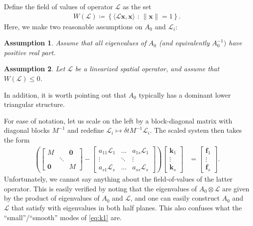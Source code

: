 \documentclass[a4paper,10pt]{article}
\newtheorem{assumption}{Assumption}
\begin{document}
Define the field of values of operator $\mathcal{L}$ as the set
%
\begin{align}\label{eq:fov}
W(\mathcal{L}) \coloneqq \left\{ \langle \mathcal{L}\mathbf{x},\mathbf{x}\rangle \text{ : }
	\|\mathbf{x}\| = 1 \right\}.
\end{align}
Here, we make two reasonable assumptions on $A_0$ and $\mathcal{L}_i$:
%
\begin{assumption}\label{ass:eig}
Assume that all eigenvalues of $A_0$ (and equivalently $A_0^{-1})$ have positive real part.
\end{assumption}
\begin{assumption}\label{ass:fov}
Let $\mathcal{L}$ be a linearized spatial operator, and assume that $W(\mathcal{L}) \leq 0$.
\end{assumption}
%
\noindent
In addition, it is worth pointing out that $A_0$ typically has a dominant
lower triangular structure.

For ease of notation, let us scale on the left by a block-diagonal matrix
with diagonal blocks $M^{-1}$ and redefine $\mathcal{L}_i \mapsto
\delta tM^{-1}\mathcal{L}_i$. The scaled system then takes the form
%
\begin{align}\label{eq:k1}
\left( \begin{bmatrix} M & & \mathbf{0} \\ & \ddots \\ \mathbf{0} & & M \end{bmatrix}
	- \begin{bmatrix} a_{11}\mathcal{L}_1 & ... & a_{1s}\mathcal{L}_1 \\
	\vdots & \ddots & \vdots \\ a_{s1}\mathcal{L}_s & ... & a_{ss} \mathcal{L}_s \end{bmatrix} \right)
	\begin{bmatrix} \mathbf{k}_1 \\ \vdots \\ \mathbf{k}_s \end{bmatrix} 
& = \begin{bmatrix} \mathbf{f}_1 \\ \vdots \\ \mathbf{f}_s \end{bmatrix}.
\end{align}
%
Unfortunately, we cannot say anything about the field-of-values of the latter operator.
This is easily verified by noting that the eigenvalues of $A_0\otimes \mathcal{L}$
are given by the product of eigenvalues of $A_0$ and $\mathcal{L}$, and one can easily
construct $A_0$ and $\mathcal{L}$ that satisfy  with eigenvalues
in both half planes. This also confuses what the ``small''/``smooth'' modes of
\eqref{eq:k1} are. 
\end{document}
